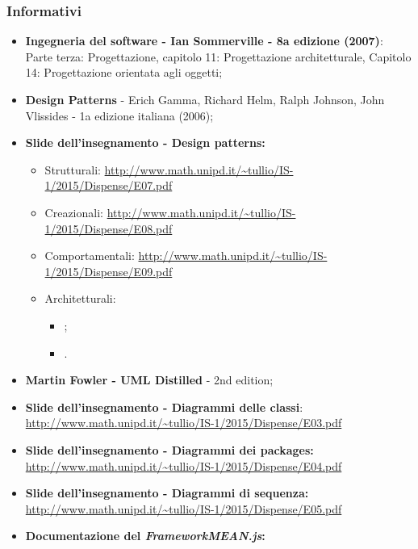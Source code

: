 \subsubsection{Informativi}
\begin{itemize}
	\item \textbf{Ingegneria del software - Ian Sommerville - 8a edizione (2007)}: \\
	Parte terza: Progettazione, capitolo 11: Progettazione architetturale, Capitolo 14: Progettazione orientata agli oggetti;
	\item \textbf{Design Patterns} - Erich Gamma, Richard Helm, Ralph Johnson, John Vlissides - 1a edizione italiana (2006);
	\item \textbf{Slide dell'insegnamento - Design patterns:}
	\begin{itemize}
		\item Strutturali: \url{http://www.math.unipd.it/~tullio/IS-1/2015/Dispense/E07.pdf}
		\item Creazionali: \url{http://www.math.unipd.it/~tullio/IS-1/2015/Dispense/E08.pdf}
		\item Comportamentali: \url{http://www.math.unipd.it/~tullio/IS-1/2015/Dispense/E09.pdf}
		\item Architetturali:
		\begin{itemize}
			\item {};
			\item {}.
		\end{itemize} 
	\end{itemize}
	\item \textbf{Martin Fowler - UML Distilled} - 2nd edition;
	\item \textbf{Slide dell'insegnamento - Diagrammi delle classi}: \\
	\url{http://www.math.unipd.it/~tullio/IS-1/2015/Dispense/E03.pdf}
	\item \textbf{Slide dell'insegnamento - Diagrammi dei packages:} \\
	\url{http://www.math.unipd.it/~tullio/IS-1/2015/Dispense/E04.pdf}
	\item \textbf{Slide dell'insegnamento - Diagrammi di sequenza:} \\
	\url{http://www.math.unipd.it/~tullio/IS-1/2015/Dispense/E05.pdf}
	\item \textbf{Documentazione del \textit{FrameworkMEAN.js}:} \\

\end{itemize}

